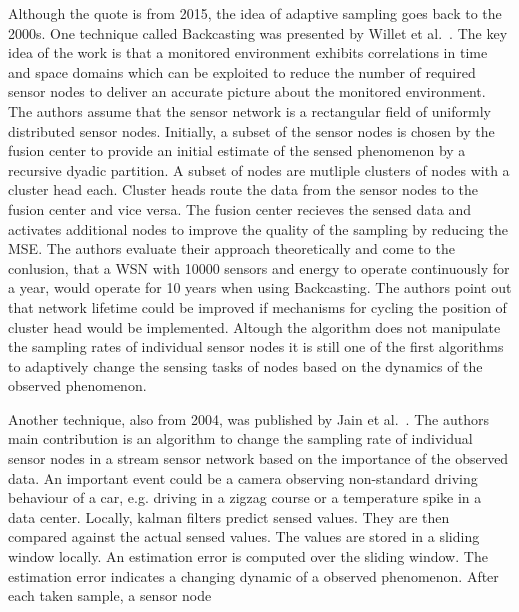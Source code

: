 
\par
Although the quote is from 2015, the idea of adaptive sampling goes back to the
2000s. One technique called Backcasting was presented by Willet et
al.~\cite{willett2004backcasting}. The key idea of the work is that a monitored
environment exhibits correlations in time and space domains which can be
exploited to reduce the number of required sensor nodes to deliver an accurate
picture about the monitored environment. The authors assume that the sensor
network is a rectangular field of uniformly distributed sensor nodes.
Initially, a subset of the sensor nodes is chosen by the fusion center to
provide an initial estimate of the sensed phenomenon by a recursive dyadic
partition. A subset of nodes are mutliple clusters of nodes with a cluster head
each. Cluster heads route the data from the sensor nodes to the fusion center
and vice versa. The fusion center recieves the sensed data and activates
additional nodes to improve the quality of the sampling by reducing the
\ac{MSE}. The authors evaluate their approach theoretically and come to the
conlusion, that a \ac{WSN} with 10000 sensors and energy to operate
continuously for a year, would operate for 10 years when using Backcasting. The
authors point out that network lifetime could be improved if mechanisms for
cycling the position of cluster head would be implemented. Altough the
algorithm does not manipulate the sampling rates of individual sensor nodes it
is still one of the first algorithms to adaptively change the sensing tasks of
nodes based on the dynamics of the observed phenomenon.
\par
Another technique, also from 2004, was published by Jain et
al.~\cite{jain2004adaptive}. The authors main contribution is an algorithm to
change the sampling rate of individual sensor nodes in a stream sensor network
based on the importance of the observed data. An important event could be a
camera observing non-standard driving behaviour of a car, e.g. driving in a
zigzag course or a temperature spike in a data center. Locally, kalman filters
predict sensed values. They are then compared against the actual sensed values.
The values are stored in a sliding window locally. An estimation error is
computed over the sliding window. The estimation error indicates a changing
dynamic of a observed phenomenon. After each taken sample, a sensor node
